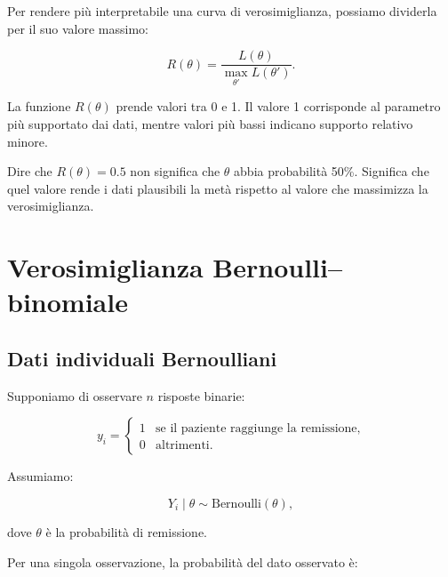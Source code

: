 \documentclass[
  italian,
  letterpaper,
  a4paper,
  11pt,
  open=any]{scrbook}
\theoremstyle{plain}
\theoremstyle{definition}
\theoremstyle{definition}
\theoremstyle{remark}
\begin{document}
Per rendere più interpretabile una curva di verosimiglianza, possiamo
dividerla per il suo valore massimo:

\[
R(\theta) = \frac{L(\theta)}{\max_{\theta'} L(\theta')}.
\]

La funzione \(R(\theta)\) prende valori tra 0 e 1. Il valore 1
corrisponde al parametro più supportato dai dati, mentre valori più
bassi indicano supporto relativo minore.

\begin{tcolorbox}[enhanced jigsaw, arc=.35mm, bottomrule=.15mm, bottomtitle=1mm, breakable, colback=white, colbacktitle=quarto-callout-note-color!10!white, colframe=quarto-callout-note-color-frame, coltitle=black, left=2mm, leftrule=.75mm, opacityback=0, opacitybacktitle=0.6, rightrule=.15mm, title=\textcolor{quarto-callout-note-color}{\faInfo}\hspace{0.5em}{Interpretazione prudente}, titlerule=0mm, toprule=.15mm, toptitle=1mm]

Dire che \(R(\theta)=0.5\) non significa che \(\theta\) abbia
probabilità 50\%. Significa che quel valore rende i dati plausibili la
metà rispetto al valore che massimizza la verosimiglianza.

\end{tcolorbox}

\section{Verosimiglianza
Bernoulli--binomiale}\label{sec-binomial-likelihood}

\subsection{Dati individuali
Bernoulliani}\label{dati-individuali-bernoulliani}

Supponiamo di osservare \(n\) risposte binarie:

\[
y_i =
\begin{cases}
1 & \text{se il paziente raggiunge la remissione}, \\
0 & \text{altrimenti}.
\end{cases}
\]

Assumiamo:

\[
Y_i \mid \theta \sim \text{Bernoulli}(\theta),
\]

dove \(\theta\) è la probabilità di remissione.

Per una singola osservazione, la probabilità del dato osservato è:
\end{document}
